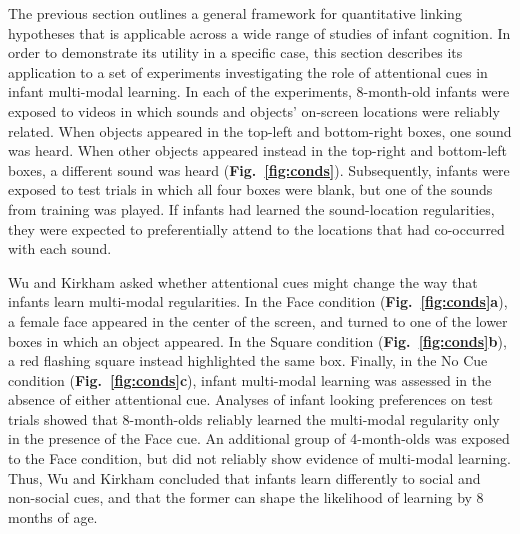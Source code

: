 \documentclass[12pt]{article}
\begin{document}
The previous section outlines a general framework for quantitative linking hypotheses that is applicable across a wide range of studies of infant cognition. In order to demonstrate its utility in a specific case, this section describes its application to a set of experiments investigating the role of attentional cues in infant multi-modal learning. In each of the experiments, 8-month-old infants were exposed to videos in which sounds and objects’ on-screen locations were reliably related. When objects appeared in the top-left and bottom-right boxes, one sound was heard. When other objects appeared instead in the top-right and bottom-left boxes, a different sound was heard (\textbf{Fig.~\ref{fig:conds}}). Subsequently, infants were exposed to test trials in which all four boxes were blank, but one of the sounds from training was played. If infants had learned the sound-location regularities, they were expected to preferentially attend to the locations that had co-occurred with each sound.

	Wu and Kirkham \cite{Wu2010a} asked whether attentional cues might change the way that infants learn multi-modal regularities. In the Face condition (\textbf{Fig.~\ref{fig:conds}a}), a female face appeared in the center of the screen, and turned to one of the lower boxes in which an object appeared. In the Square condition (\textbf{Fig.~\ref{fig:conds}b}), a red flashing square instead highlighted the same box. Finally, in the No Cue condition (\textbf{Fig.~\ref{fig:conds}c}), infant multi-modal learning was assessed in the absence of either attentional cue. Analyses of infant looking preferences on test trials showed that 8-month-olds reliably learned the multi-modal regularity only in the presence of the Face cue. An additional group of 4-month-olds was exposed to the Face condition, but did not reliably show evidence of multi-modal learning. Thus, Wu and Kirkham \cite{Wu2010a} concluded that infants learn differently to social and non-social cues, and that the former can shape the likelihood of learning by 8 months of age.
\end{document}
